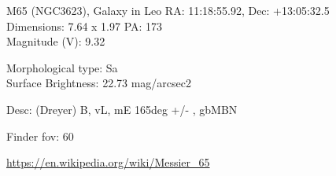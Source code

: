 \begin{block}{M65 (NGC3623), Galaxy in Leo}
    RA: 11:18:55.92, Dec: +13:05:32.5 \\ 
    Dimensions: 7.64 x 1.97 PA: 173 \\ 
    Magnitude (V): 9.32

    Morphological type: Sa \\ 
    Surface Brightness: 22.73 mag/arcsec2 

    Desc: (Dreyer) B, vL, mE 165deg +/- , gbMBN 

    Finder fov: 60 

    \url{https://en.wikipedia.org/wiki/Messier_65} 
\end{block}